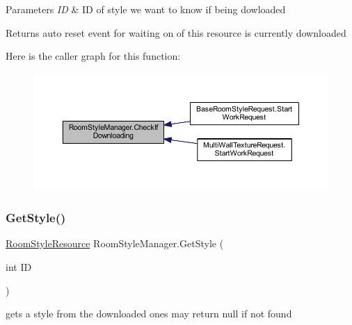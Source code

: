 \begin{DoxyParams}{Parameters}
{\em ID} & ID of style we want to know if being dowloaded\\
\hline
\end{DoxyParams}
\begin{DoxyReturn}{Returns}
auto reset event for waiting on of this resource is currently downloaded
\end{DoxyReturn}
Here is the caller graph for this function\+:
\nopagebreak
\begin{figure}[H]
\begin{center}
\leavevmode
\includegraphics[width=350pt]{class_room_style_manager_aab9bdbc810904cb623cddcb636165a6a_icgraph}
\end{center}
\end{figure}
\mbox{\label{class_room_style_manager_acc946bc24833e24565dee0cdc3b2ef44}} 
\subsubsection{\texorpdfstring{Get\+Style()}{GetStyle()}}
{\footnotesize\ttfamily \mbox{\hyperlink{class_room_style_resource}{Room\+Style\+Resource}} Room\+Style\+Manager.\+Get\+Style (\begin{DoxyParamCaption}\item[{int}]{ID }\end{DoxyParamCaption})}



gets a style from the downloaded ones may return null if not found 


